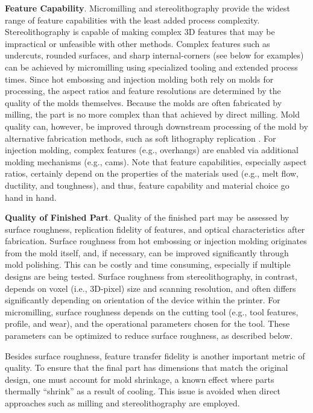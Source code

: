 {\textbf{Feature Capability}. Micromilling and stereolithography provide the widest range of feature capabilities with the least added process complexity. Stereolithography is capable of making complex 3D features that may be impractical or unfeasible with other methods. Complex features such as undercuts, rounded surfaces, and sharp internal-corners (see below for examples) can be achieved by micromilling using specialized tooling and extended process times. Since hot embossing and injection molding both rely on molds for processing, the aspect ratios and feature resolutions are determined by the quality of the molds themselves. Because the molds are often fabricated by milling, the part is no more complex than that achieved by direct milling. Mold quality can, however, be improved through downstream processing of the mold by alternative fabrication methods, such as soft lithography replication \cite{Young2011}. For injection molding, complex features (e.g., overhangs) are enabled via additional molding mechanisms (e.g., cams). Note that feature capabilities, especially aspect ratios, certainly depend on the properties of the materials used (e.g., melt flow, ductility, and toughness), and thus, feature capability and material choice go hand in hand. 

\textbf{Quality of Finished Part}. Quality of the finished part may be assessed by surface roughness, replication fidelity of features, and optical characteristics after fabrication. Surface roughness from hot embossing or injection molding originates from the mold itself, and, if necessary, can be improved significantly through mold polishing. This can be costly and time consuming, especially if multiple designs are being tested. Surface roughness from stereolithography, in contrast, depends on voxel (i.e., 3D-pixel) size and scanning resolution, and often differs significantly depending on orientation of the device within the printer. For micromilling, surface roughness depends on the cutting tool (e.g., tool features, profile, and wear), and the operational parameters chosen for the tool. These parameters can be optimized to reduce surface roughness, as described below.

Besides surface roughness, feature transfer fidelity is another important metric of quality. To ensure that the final part has dimensions that match the original design, one must account for mold shrinkage, a known effect where parts thermally “shrink” as a result of cooling. This issue is avoided when direct approaches such as milling and stereolithography are employed.

}
